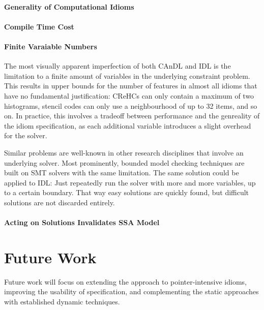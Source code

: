     \paragraph*{Generality of Computational Idioms}
    

    \paragraph*{Compile Time Cost}

    \paragraph*{Finite Varaiable Numbers}
    The most visually apparent imperfection of both CAnDL and IDL is the
    limitation to a finite amount of variables in the underlying constraint
    problem.
    This results in upper bounds for the number of features in almost all idioms
    that have no fundamental justification:
    CReHCs can only contain a maximum of two histograms, stencil codes can only
    use a neighbourhood of up to 32 items, and so on.
    In practice, this involves a tradeoff between performance and the genreality
    of the idiom specification, as each additional variable introduces a slight
    overhead for the solver.

    Similar problems are well-known in other research disciplines that involve
    an underlying solver.
    Most prominently, bounded model checking techniques are built on SMT solvers
    with the same limitation.
    The same solution could be applied to IDL: Just repeatedly run the solver
    with more and more variables, up to a certain boundary.
    That way easy solutions are quickly found, but difficult solutions are not
    discarded entirely.

    \paragraph*{Acting on Solutions Invalidates SSA Model}

\section{Future Work}

    Future work will focus on extending the approach to pointer-intensive
    idioms, improving the usability of specification, and complementing
    the static approaches with established dynamic techniques.

